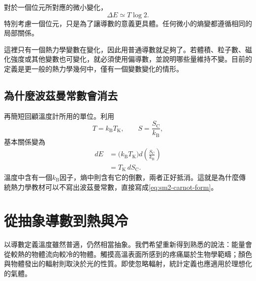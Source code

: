 對於一個位元所對應的微小變化，
\begin{equation}
 \Delta E\simeq T\log2.
 \label{eq:sm2-one-bit-energy}
\end{equation}
特別考慮一個位元，只是為了讓導數的意義更具體。任何微小的熵變都遵循相同的局部關係。

\begin{classroomqa}
\end{classroomqa}

這裡只有一個熱力學變數在變化，因此用普通導數就足夠了。若體積、粒子數、磁化強度或其他變數也可變化，就必須使用偏導數，並說明哪些量維持不變。目前的定義是更一般的熱力學幾何中，僅有一個變數變化的情形。

\subsection{為什麼波茲曼常數會消去}

再簡短回顧溫度計所用的單位。利用
\[
 T=k_{\mathrm B}T_{\mathrm K},
 \qquad
 S=\frac{S_{\mathrm C}}{k_{\mathrm B}},
\]
基本關係變為
\begin{align}
 dE
 &=\bigl(k_{\mathrm B}T_{\mathrm K}\bigr)
   d\left(\frac{S_{\mathrm C}}{k_{\mathrm B}}\right)\\
 &=T_{\mathrm K}\,dS_{\mathrm C}.
 \label{eq:sm2-carnot-form}
\end{align}
溫度中含有一個\(k_{\mathrm B}\)因子，熵中則含有它的倒數，兩者正好抵消。這就是為什麼傳統熱力學教材可以不寫出波茲曼常數，直接寫成\eqref{eq:sm2-carnot-form}。

\begin{classroomqa}
\end{classroomqa}

\section{從抽象導數到熱與冷}

以導數定義溫度雖然普適，仍然相當抽象。我們希望重新得到熟悉的說法：能量會從較熱的物體流向較冷的物體。觸摸高溫表面所感到的疼痛屬於生物學範疇；顏色與物體發出的輻射則取決於光的性質。即使忽略輻射，統計定義也應適用於理想化的氣體。

